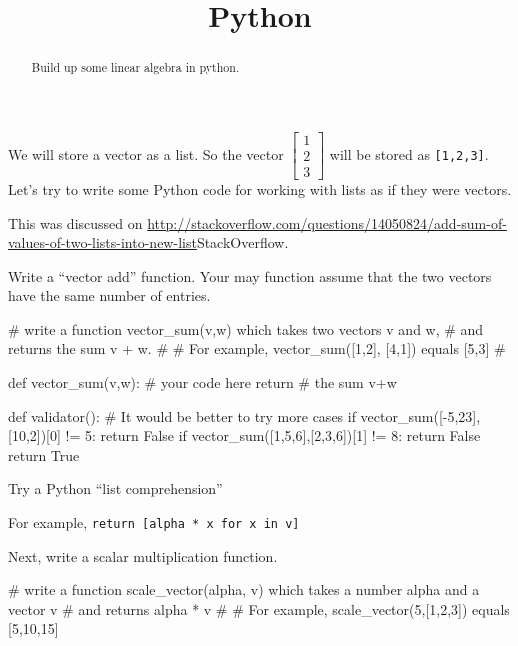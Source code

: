 \documentclass{ximera}
\title{Python}
\begin{document}
\begin{abstract}
  Build up some linear algebra in python.
\end{abstract}

\begin{exercise}
  We will store a vector as a list.  So the vector $\begin{bmatrix} 1 \\
    2 \\ 3\end{bmatrix}$ will be stored as \verb|[1,2,3]|.  Let's try
  to write some Python code for working with lists as if they were
  vectors.

\begin{solution}
  \begin{hint}
    This was discussed on \url{http://stackoverflow.com/questions/14050824/add-sum-of-values-of-two-lists-into-new-list}{StackOverflow}.
  \end{hint}

  Write a ``vector add'' function.  Your may function assume that the
  two vectors have the same number of entries.

\begin{python}
# write a function vector_sum(v,w) which takes two vectors v and w,
# and returns the sum v + w.
#
# For example, vector_sum([1,2], [4,1]) equals [5,3]
#
		
def vector_sum(v,w):
  # your code here
  return # the sum v+w

def validator():
  # It would be better to try more cases
  if vector_sum([-5,23],[10,2])[0] != 5:
    return False
  if vector_sum([1,5,6],[2,3,6])[1] != 8:
    return False
  return True

\end{python}
\end{solution}


\begin{solution}
  \begin{hint}
    Try a Python ``list comprehension''
  \end{hint}

  \begin{hint}
    For example, \verb|return [alpha * x for x in v]|
  \end{hint}

Next, write a scalar multiplication function.

\begin{python}
# write a function scale_vector(alpha, v) which takes a number alpha and a vector v
# and returns alpha * v
#
# For example, scale_vector(5,[1,2,3]) equals [5,10,15]
		

\end{python}
\end{solution}
\end{exercise}
\end{document}
